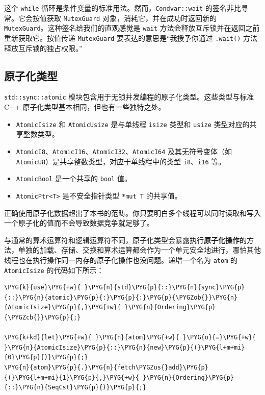 这个 \texttt{while} 循环是条件变量的标准用法。然而，\texttt{Condvar::wait} 的签名非比寻常。它会按值获取 \texttt{MutexGuard} 对象，消耗它，并在成功时返回新的 \texttt{MutexGuard}。这种签名给我们的直观感觉是 \texttt{wait} 方法会释放互斥锁并在返回之前重新获取它。按值传递 \texttt{MutexGuard} 要表达的意思是“我授予你通过 \texttt{.wait()} 方法释放互斥锁的独占权限。”

\subsection{原子化类型}

\texttt{std::sync::atomic} 模块包含用于无锁并发编程的原子化类型。这些类型与标准 C++ 原子化类型基本相同，但也有一些独特之处。

\begin{itemize}
\item \texttt{AtomicIsize} 和 \texttt{AtomicUsize} 是与单线程 \texttt{isize} 类型和 \texttt{usize} 类型对应的共享整数类型。
\item \texttt{AtomicI8}、\texttt{AtomicI16}、\texttt{AtomicI32}、\texttt{AtomicI64} 及其无符号变体（如 \texttt{AtomicU8}）是共享整数类型，对应于单线程中的类型 \texttt{i8}、\texttt{i16} 等。
\item \texttt{AtomicBool} 是一个共享的 \texttt{bool} 值。
\item \texttt{AtomicPtr<T>} 是不安全指针类型 \texttt{*mut T} 的共享值。
\end{itemize}

正确使用原子化数据超出了本书的范畴。你只要明白多个线程可以同时读取和写入一个原子化的值而不会导致数据竞争就足够了。

与通常的算术运算符和逻辑运算符不同，原子化类型会暴露执行\textbf{原子化操作}的方法，单独的加载、存储、交换和算术运算都会作为一个单元安全地进行，哪怕其他线程也在执行操作同一内存的原子化操作也没问题。递增一个名为 \texttt{atom} 的 \texttt{AtomicIsize} 的代码如下所示：

\begin{Verbatim}[commandchars=\\\{\},breaklines=true,breakanywhere=true,fontsize=\codefont,xleftmargin=17bp]
\PYG{k}{use}\PYG{+w}{ }\PYG{n}{std}\PYG{p}{::}\PYG{n}{sync}\PYG{p}{::}\PYG{n}{atomic}\PYG{p}{:}\PYG{p}{:}\PYG{p}{\PYGZob{}}\PYG{n}{AtomicIsize}\PYG{p}{,}\PYG{+w}{ }\PYG{n}{Ordering}\PYG{p}{\PYGZcb{}}\PYG{p}{;}

\PYG{k+kd}{let}\PYG{+w}{ }\PYG{n}{atom}\PYG{+w}{ }\PYG{o}{=}\PYG{+w}{ }\PYG{n}{AtomicIsize}\PYG{p}{::}\PYG{n}{new}\PYG{p}{(}\PYG{l+m+mi}{0}\PYG{p}{)}\PYG{p}{;}
\PYG{n}{atom}\PYG{p}{.}\PYG{n}{fetch\PYGZus{}add}\PYG{p}{(}\PYG{l+m+mi}{1}\PYG{p}{,}\PYG{+w}{ }\PYG{n}{Ordering}\PYG{p}{::}\PYG{n}{SeqCst}\PYG{p}{)}\PYG{p}{;}
\end{Verbatim}

